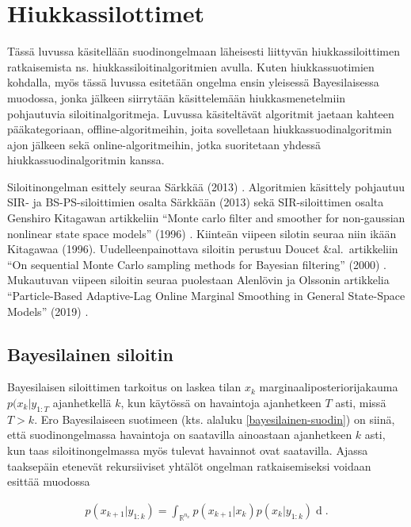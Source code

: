 \documentclass[
  12pt,
  a4paper, twoside]{book}
\begin{document}
\chapter{Hiukkassilottimet} \label{hiukkassiloittimet}

Tässä luvussa käsitellään suodinongelmaan läheisesti liittyvän hiukkassiloittimen ratkaisemista ns. hiukkassiloitinalgoritmien avulla. Kuten hiukkassuotimien kohdalla, myös tässä luvussa esitetään ongelma ensin yleisessä Bayesilaisessa muodossa, jonka jälkeen siirrytään käsittelemään hiukkasmenetelmiin pohjautuvia siloitinalgoritmeja. Luvussa käsiteltävät algoritmit jaetaan kahteen pääkategoriaan, offline-algoritmeihin, joita sovelletaan hiukkassuodinalgoritmin ajon jälkeen sekä online-algoritmeihin, jotka suoritetaan yhdessä hiukkassuodinalgoritmin kanssa.

Siloitinongelman esittely seuraa Särkkää (2013) \citep{sarkka-2013}. Algoritmien käsittely pohjautuu SIR- ja BS-PS-siloittimien osalta Särkkään (2013) \citep{sarkka-2013} sekä SIR-siloittimen osalta Genshiro Kitagawan artikkeliin ``Monte carlo filter and smoother for non-gaussian nonlinear state space models'' (1996) \citep{kitagawa-1996}. Kiinteän viipeen silotin seuraa niin ikään Kitagawaa (1996). Uudelleenpainottava siloitin perustuu Doucet \&al.~artikkeliin ``On sequential Monte Carlo sampling methods for Bayesian filtering'' (2000) \citep{Doucet-2000}. Mukautuvan viipeen siloitin seuraa puolestaan Alenlövin ja Olssonin artikkelia ``Particle-Based Adaptive-Lag Online Marginal Smoothing in General State-Space Models'' (2019) \citep{alenlov-2019}.

\section{Bayesilainen siloitin}

Bayesilaisen siloittimen tarkoitus on laskea tilan \(x_k\) marginaaliposteriorijakauma \(p(x_k|y_{1:T}\) ajanhetkellä \(k\), kun käytössä on havaintoja ajanhetkeen \(T\) asti, missä \(T>k\). Ero Bayesilaiseen suotimeen (kts. alaluku \ref{bayesilainen-suodin}) on siinä, että suodinongelmassa havaintoja on saatavilla ainoastaan ajanhetkeen \(k\) asti, kun taas siloitinongelmassa myös tulevat havainnot ovat saatavilla. Ajassa taaksepäin etenevät rekursiiviset yhtälöt ongelman ratkaisemiseksi voidaan esittää muodossa

\begin{align}\label{siloitin-prediktiivinen}
p(x_{k+1}|y_{1:k})=\int_{\mathbb{R}^{n_x}}p(x_{k+1}|x_k)p(x_k|y_{1:k})\mathop{dx_k}.
\end{align}
\end{document}
